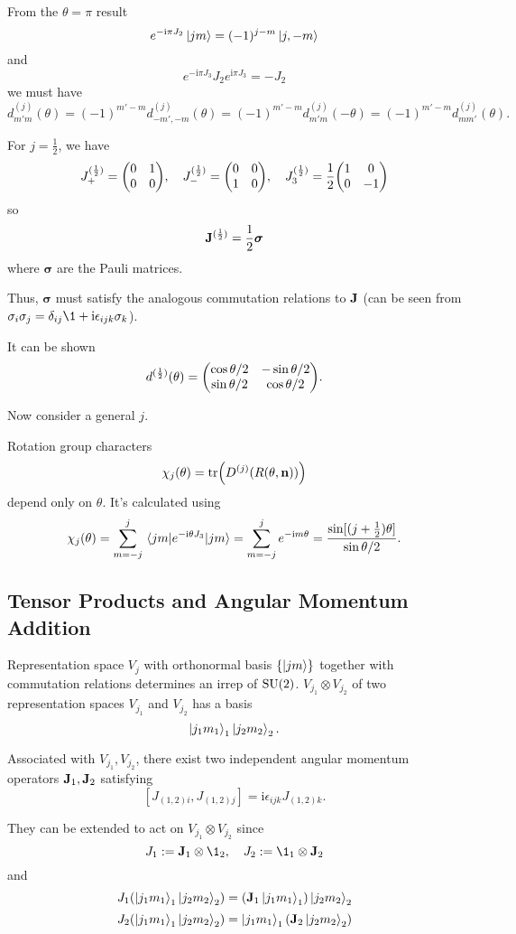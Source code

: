 \documentclass[a4paper,11pt]{article}
\begin{document}
	From the $\theta = \pi$ result
	\[
		e ^{-\mathrm{i} \pi J_2}\ket{jm} = (-1)^{j-m} \ket{j,-m}
	\]
	and 
	\[
		e ^{-\mathrm{i} \pi J_3}J_2 e ^{\mathrm{i} \pi J_3} = - J_2
	\]
	we must have
	\[
		d _{m'm}^{(j)}(\theta)= (-1)^{m'-m} d _{-m',-m}^{(j)}(\theta) = (-1)^{m'-m} d _{m'm}^{(j)}(-\theta) = (-1)^{m'-m} d	_{mm'}^{(j)}(\theta).
	\]
	
	For $j = \frac{1}{2}$, we have
	\[
		J_+ ^{(\frac{1}{2})} = \mqty(0 & 1\\0 & 0), \quad J_- ^{(\frac{1}{2})} = \mqty(0 & 0 \\ 1 & 0), \quad J_3 ^{(\frac{1}{2})} = \frac{1}{2} \mqty(1 & 0\\0 & -1)
	\]
	so
	\[
		\vb J ^{(\frac{1}{2})} = \frac{1}{2} \bm \sigma
	\]
	where $\bm \sigma$ are the Pauli matrices.

	Thus, $\bm \sigma$ must satisfy the analogous commutation relations to $\vb J$ (can be seen from $\sigma_i \sigma_j = \delta _{ij} \1 + \mathrm{i} \epsilon _{ijk} \sigma_k$).

	It can be shown
	\[
		d ^{(\frac{1}{2})}(\theta) = \mqty(\cos \theta/2 & - \sin \theta/2 \\ \sin \theta/2 & \cos \theta/2).
	\]

	Now consider a general $j$.

	Rotation group characters
	\[
		\chi_j (\theta) = \tr(D^{(j)}(R(\theta,\vb n)))
	\]
	depend only on $\theta$. It's calculated using
	\[
		\chi_j (\theta) = \sum _{m = -j}^{j} \mel{jm}{e ^{-\mathrm{i} \theta J_3}}{jm} = \sum _{m = -j}^{j} e ^{- \mathrm{i} m \theta} = \frac{\sin[(j+\frac{1}{2})\theta]}{\sin \theta/2}.
	\]
	
	\subsection{Tensor Products and Angular Momentum Addition}

	Representation space $V_j$ with orthonormal basis $\{\ket{jm}\}$ together with commutation relations determines an irrep of $\operatorname{SU}(2)$. $V _{j_1}\otimes V _{j_2}$ of two representation spaces $V _{j_1}$ and $V _{j_2}$ has a basis
	\[
		\ket{j_1 m_1}_1\ket{j_2 m_2}_2.
	\]
	
	Associated with $V _{j_1}, V _{j_2}$, there exist two independent angular momentum operators $\vb J_1, \vb J_2$ satisfying
	\[
		[J _{(1,2)i}, J _{(1,2)j}] = \mathrm{i} \epsilon _{ijk} J _{(1,2)k}.
	\]

	They can be extended to act on $V _{j_1}\otimes V _{j_2}$ since
	\[
		J_1 := \vb J_1 \otimes \1_2, \quad J_2 := \1_1 \otimes \vb J_2
	\]
	and 
	\[
		J_1 (\ket{j_1 m_1}_1 \ket{j_2 m_2}_2) = (\vb J_1 \ket{j_1 m_1}_1) \ket{j_2 m_2}_2
	\]
	\[
		J_2 (\ket{j_1 m_1}_1 \ket{j_2 m_2}_2) = \ket{j_1 m_1}_1 (\vb J_2\ket{j_2 m_2}_2)
	\]
\end{document}
